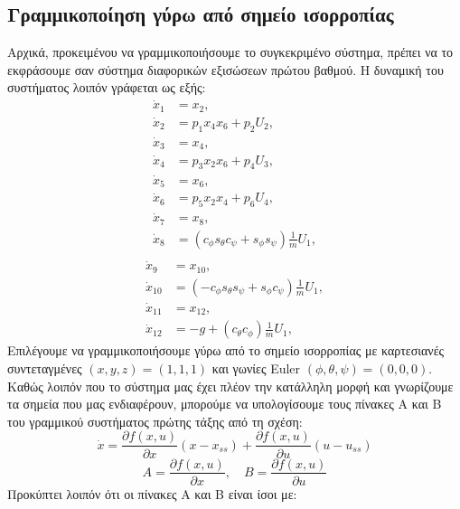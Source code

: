 \documentclass[a4paper,12pt]{article}
\begin{document}
\subsection{Γραμμικοποίηση γύρω από σημείο ισορροπίας}
Αρχικά, προκειμένου να γραμμικοποιήσουμε το συγκεκριμένο σύστημα, πρέπει να το εκφράσουμε σαν σύστημα διαφορικών εξισώσεων πρώτου βαθμού. Η δυναμική του συστήματος λοιπόν γράφεται ως εξής:
\begin{align*}
\dot{x}_1 &= x_2, \\
\dot{x}_2 &= p_1 x_4 x_6 + p_2 U_2, \\
\dot{x}_3 &= x_4, \\
\dot{x}_4 &= p_3 x_2 x_6 + p_4 U_3, \\
\dot{x}_5 &= x_6, \\
\dot{x}_6 &= p_5 x_2 x_4 + p_6 U_4, \\
\dot{x}_7 &= x_8, \\
\dot{x}_8 &= \left( c_\phi s_\theta c_\psi + s_\phi s_\psi \right) \frac{1}{m} U_1, \\
\end{align*}
\begin{align*}
\dot{x}_9 &= x_{10}, \\
\dot{x}_{10} &= \left( -c_\phi s_\theta s_\psi + s_\phi c_\psi \right) \frac{1}{m} U_1, \\
\dot{x}_{11} &= x_{12}, \\
\dot{x}_{12} &= -g + \left( c_\theta c_\phi \right) \frac{1}{m} U_1,
\end{align*}
Επιλέγουμε να γραμμικοποιήσουμε γύρω από το σημείο ισορροπίας με καρτεσιανές συντεταγμένες $(x,y,z) = (1, 1, 1)$ και γωνίες Euler $(\phi, \theta, \psi) = (0, 0, 0)$. Καθώς λοιπόν που το σύστημα μας έχει πλέον την κατάλληλη μορφή και γνωρίζουμε τα σημεία που μας ενδιαφέρουν, μπορούμε να υπολογίσουμε τους πίνακες A και B του γραμμικού συστήματος πρώτης τάξης από τη σχέση:
\begin{equation}
    \dot{x} = \frac{\partial f(x,u)}{\partial x} (x - x_{ss}) + \frac{\partial f(x,u)}{\partial u} (u - u_{ss})
\end{equation}
\begin{equation}
    A = \frac{\partial f(x,u)}{\partial x},  \quad  B = \frac{\partial f(x,u)}{\partial u}
\end{equation}
Προκύπτει λοιπόν ότι οι πίνακες Α και Β είναι ίσοι με:
\setcounter{MaxMatrixCols}{12}
\end{document}
